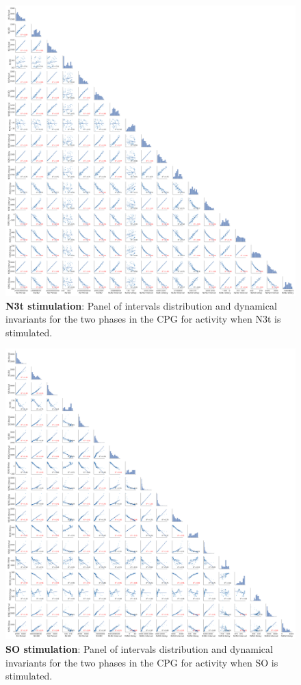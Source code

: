 \begin{figure}[htbp]
	\centering
	\includegraphics[width=\textwidth]{./invariants/data/MODEL/n3t_driven/images/3phases/_output_pairplot.png}
	\caption{\textbf{N3t stimulation}: Panel of intervals distribution and dynamical invariants for the two phases in the CPG for activity when N3t is stimulated.}
	\label{fig:model n3t stimulation pairplot}
\end{figure}


\begin{figure}[htbp]
	\centering
	\includegraphics[width=\textwidth]{./invariants/data/MODEL/so_driven/images/3phases/_output_pairplot.png}
	\caption{\textbf{SO stimulation}: Panel of intervals distribution and dynamical invariants for the two phases in the CPG for activity when SO is stimulated.}
	\label{fig:model so stimulation pairplot}
\end{figure}



